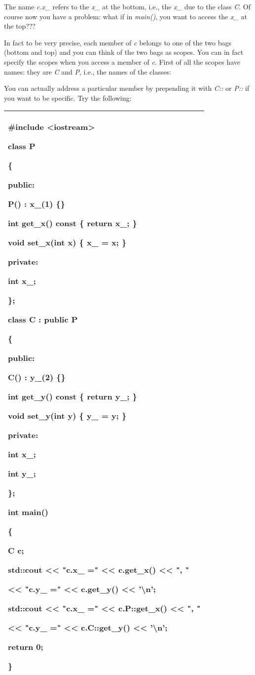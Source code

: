 \documentclass[
]{article}
\begin{document}
The name \emph{c.x\_} refers to the \emph{x\_} at the bottom, i.e., the
\emph{x\_} due to the class \emph{C}. Of course now you have a problem:
what if in \emph{main()}, you want to access the \emph{x\_} at the
top???

In fact to be very precise, each member of \emph{c} belongs to one of
the two bags (bottom and top) and you can think of the two bags as
scopes. You can in fact specify the scopes when you access a member of
\emph{c}. First of all the scopes have names: they are \emph{C} and
\emph{P}, i.e., the names of the classes:

You can actually address a particular member by prepending it with
\emph{C::} or \emph{P::} if you want to be specific. Try the following:

\begin{longtable}[]{@{}l@{}}
\toprule
\endhead
\begin{minipage}[t]{0.97\columnwidth}\raggedright
\#include \textless iostream\textgreater{}

class P

\{

public:

P() : x\_(1) \{\}

int get\_x() const \{ return x\_; \}

void set\_x(int x) \{ x\_ = x; \}

private:

int x\_;

\};

class C : public P

\{

public:

C() : y\_(2) \{\}

int get\_y() const \{ return y\_; \}

void set\_y(int y) \{ y\_ = y; \}

private:

int x\_;

int y\_;

\};

int main()

\{

C c;

std::cout \textless\textless{} "c.x\_ =" \textless\textless{} c.get\_x()
\textless\textless{} ", "

\textless\textless{} "c.y\_ =" \textless\textless{} c.get\_y()
\textless\textless{} '\textbackslash n';

std::cout \textless\textless{} "c.x\_ =" \textless\textless{}
c.\textbf{P::}get\_x() \textless\textless{} ", "

\textless\textless{} "c.y\_ =" \textless\textless{}
c.\textbf{C::}get\_y() \textless\textless{} '\textbackslash n';

return 0;

\}\strut
\end{minipage}\tabularnewline
\bottomrule
\end{longtable}
\end{document}
